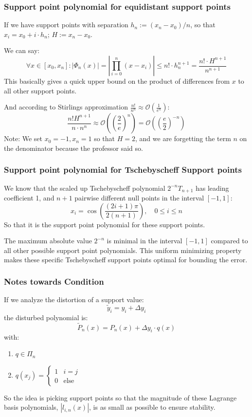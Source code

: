 \documentclass{article}
\begin{document}
\subsubsection{Support point polynomial for equidistant support points}
If we have support points with separation $h_n := (x_n-x_0)/n$, so that $x_i = x_0 + i\cdot h_n$; $H:= x_n-x_0$.

We can say:
\[\forall x \in [x_0,x_n] : |\Phi_n(x)| = \left|\prod_{i=0}^n(x-x_i)\right| \leq n!\cdot h_n^{n+1} = \frac{n!\cdot H^{n+1}}{n^{n+1}}\]
This basically gives a quick upper bound on the product of differences from $x$ to all other support points. 

And according to Stirlings approximation $\frac{n!}{n^n} \approx \mathcal{O}(\frac{1}{e^n})$:
\[\frac{n!H^{n+1}}{n\cdot n^n}\approx \mathcal{O}\left(\left(\frac{2}{e}\right)^n\right) = \mathcal{O}\left(\left(\frac{e}{2}\right)^{-n}\right)\]
Note: We set $x_0 = -1, x_n = 1$ so that $H = 2$, and we are forgetting the term $n$ on the denominator because the professor said so.

\subsubsection{Support point polynomial for Tschebyscheff Support points}
We know that the scaled up Tschebyscheff polynomial $2^{-n}T_{n+1}$ has leading coefficient 1, and $n+1$ pairwise different null points in the interval $[-1,1]$:
\[x_i = \cos \left(\frac{(2i+1)\pi}{2(n+1)}\right), \quad 0 \leq i \leq n\]
So that it is the support point polynomial for these support points.

The maximum absolute value $2^{-n}$ is minimal in the interval $[-1,1]$ compared to all other possible support point polynomials. This uniform minimizing property makes these specific Tschebyscheff support points optimal for bounding the error.

\subsubsection{Notes towards Condition}
If we analyze the distortion of a support value:
\[\tilde{y}_i = y_i + \Delta y_i\]
the disturbed polynomial is:
\[\tilde{P}_n(x) = P_n(x) + \Delta y_i \cdot q(x)\]
with:
\begin{enumerate}
  \item $q\in \Pi_n$
  \item $q(x_j) = \begin{cases}
    1 & i = j \\
    0 & \text{else}
  \end{cases}$
\end{enumerate}
So the idea is picking support points so that the magnitude of these Lagrange basis polynomials, $|l_{i,n}(x)|$, is as small as possible to ensure stability.
\end{document}
